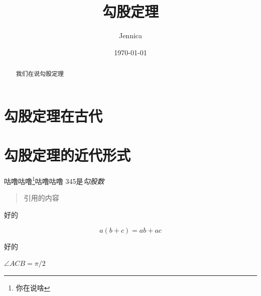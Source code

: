 \documentclass[UTF8]{ctexart}
\title{勾股定理}
\author{Jennica}
\date{\today}
\begin{document}
\maketitle

\begin{abstract}
    我们在说勾股定理
\end{abstract}

\tableofcontents
\section{勾股定理在古代}
\section{勾股定理的近代形式}


咕噜咕噜\footnote{你在说啥}咕噜咕噜
345是\emph{勾股数}

\begin{quote}
    \kaishu 引用的内容
\end{quote}

好的

\begin{equation}
    a(b+c) = ab + ac
\end{equation}

好的

$\angle ACB = \pi /2$
\end{document}

